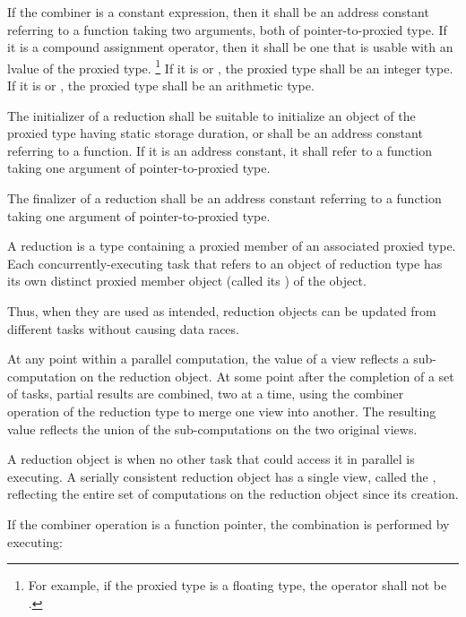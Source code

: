 \pnum
If the combiner is a constant expression,
then it shall be an address constant
referring to a function taking two arguments,
both of pointer-to-proxied type.
If it is a compound assignment operator,
then it shall be one that is usable with an lvalue of the proxied type.%
\footnote{
For example, if the proxied type is a floating type,
the operator shall not be
\tcode{|=}.
}
If it is
or
,
the proxied type shall be an integer type.
If it is
or
,
the proxied type shall be an arithmetic type.

\pnum
The initializer of a reduction
shall be suitable to initialize
an object of the proxied type
having static storage duration,
or shall be an address constant referring to a function.
If it is an address constant,
it shall refer to a function
taking one argument of pointer-to-proxied type.

\pnum
The finalizer of a reduction
shall be an address constant referring to a function
taking one argument of pointer-to-proxied type.


\pnum
A reduction is a type containing a proxied member
of an associated proxied type.
Each concurrently-executing task
that refers to an object of reduction type
has its own distinct proxied member object
(called its
)
of the object.

\begin{note}
Thus, when they are used as intended,
reduction objects can be updated from different tasks
without causing data races.
\end{note}

\pnum
At any point within a parallel computation,
the value of a view reflects a sub-computation on the reduction object.
At some point after the completion of a set of tasks,
partial results are combined, two at a time,
using the combiner operation of the reduction type
to merge one view into another.
The resulting value reflects the union
of the sub-computations on the two original views.
 
\pnum
A reduction object is
when no other task that could access it in parallel is executing.
A serially consistent reduction object has a single view,
called the
,
reflecting the entire set of computations on the reduction object
since its creation.
 
\pnum
If the combiner operation is a function pointer,
the combination is performed by executing:

